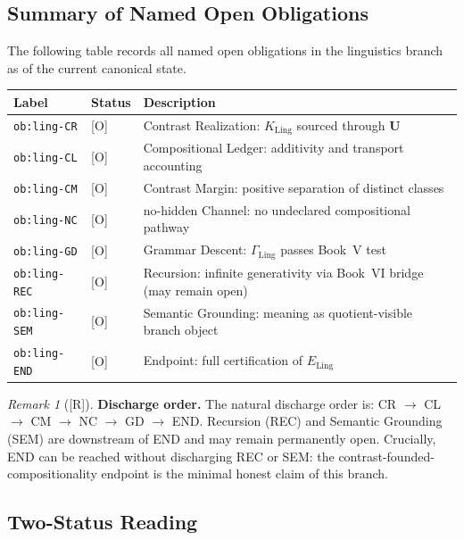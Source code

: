 \documentclass[12pt,oneside]{amsbook}
\theoremstyle{plain}
\theoremstyle{definition}
\theoremstyle{remark}
\newtheorem{remark}[theorem]{Remark}
\newcommand{\status}[1]{\textup{[#1]}}
\begin{document}
\subsection{Summary of Named Open Obligations}

The following table records all named open obligations in the
linguistics branch as of the current canonical state.

\medskip
\noindent
\begin{tabular}{|l|l|p{8.5cm}|}
\hline
\textbf{Label} & \textbf{Status} & \textbf{Description} \\
\hline
\texttt{ob:ling-CR} & [O] & Contrast Realization: $K_{\mathrm{Ling}}$ sourced through $\mathbf{U}$ \\
\texttt{ob:ling-CL} & [O] & Compositional Ledger: additivity and transport accounting \\
\texttt{ob:ling-CM} & [O] & Contrast Margin: positive separation of distinct classes \\
\texttt{ob:ling-NC} & [O] & no-hidden Channel: no undeclared compositional pathway \\
\texttt{ob:ling-GD} & [O] & Grammar Descent: $\Gamma_{\mathrm{Ling}}$ passes Book~V test \\
\texttt{ob:ling-REC} & [O] & Recursion: infinite generativity via Book~VI bridge (may remain open) \\
\texttt{ob:ling-SEM} & [O] & Semantic Grounding: meaning as quotient-visible branch object \\
\texttt{ob:ling-END} & [O] & Endpoint: full certification of $E_{\mathrm{Ling}}$ \\
\hline
\end{tabular}

\medskip

\begin{remark}[\status{R}]\label{rem:ling-discharge-order}
\textbf{Discharge order.}
The natural discharge order is: CR $\to$ CL $\to$ CM $\to$ NC $\to$
GD $\to$ END. Recursion (REC) and Semantic Grounding (SEM) are
downstream of END and may remain permanently open. Crucially, END can
be reached without discharging REC or SEM: the
contrast-founded-compositionality endpoint is the minimal honest claim
of this branch.
\end{remark}

\subsection{Two-Status Reading}
\end{document}
